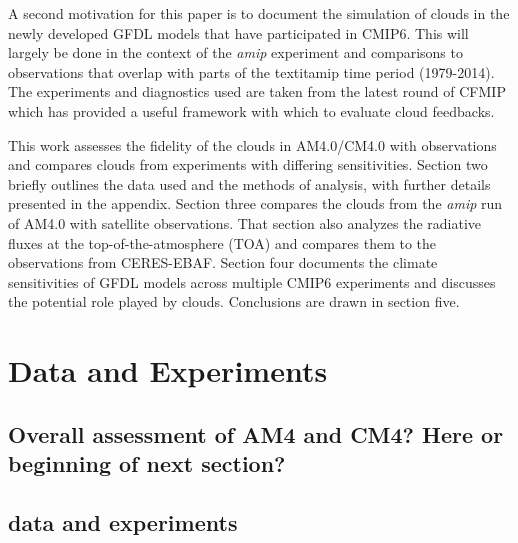 \documentclass[draft]{agujournal2019}
\begin{document}
A second motivation for this paper is to document the simulation of clouds in the newly developed GFDL models that 
have participated in CMIP6.  This will largely be done in the context of the \textit{amip} experiment and comparisons to observations
that overlap with parts of the textit{amip} time period (1979-2014).  The experiments and diagnostics used are taken from the latest 
round of CFMIP which has provided a useful framework with which to evaluate cloud feedbacks.   

This work assesses the fidelity of the clouds in AM4.0/CM4.0 with observations and compares clouds from experiments 
with differing sensitivities. 
Section two briefly outlines the data used and the methods of analysis, with further details presented in the appendix.  Section
three compares the clouds from the \textit{amip} run of AM4.0 with satellite observations.  That section also 
analyzes the radiative fluxes at the top-of-the-atmosphere (TOA) and compares them to the observations from 
CERES-EBAF.    Section four documents the climate sensitivities of GFDL models across multiple CMIP6 experiments 
and discusses the potential role played by clouds.   Conclusions are drawn in section five.  

\section{Data and Experiments}

\subsection{Overall assessment of AM4 and CM4? Here or beginning of next section?}

\subsection{data and experiments}
\end{document}
